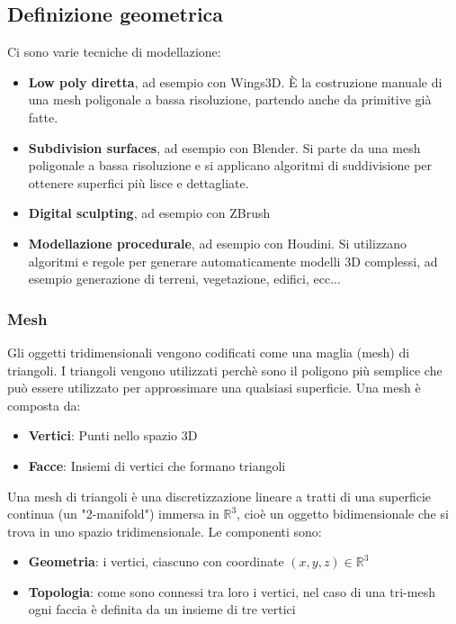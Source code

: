 \documentclass[a4paper]{article}
\begin{document}
\subsection{Definizione geometrica}
Ci sono varie tecniche di modellazione:
\begin{itemize}
  \item \textbf{Low poly diretta}, ad esempio con Wings3D. È la costruzione manuale di una mesh
    poligonale a bassa risoluzione, partendo anche da primitive già fatte.
  \item \textbf{Subdivision surfaces}, ad esempio con Blender. Si parte da una mesh
    poligonale a bassa risoluzione e si applicano algoritmi di suddivisione per
    ottenere superfici più lisce e dettagliate.
  \item \textbf{Digital sculpting}, ad esempio con ZBrush
  \item \textbf{Modellazione procedurale}, ad esempio con Houdini. Si utilizzano algoritmi
    e regole per generare automaticamente modelli 3D complessi, ad esempio generazione di
    terreni, vegetazione, edifici, ecc...
\end{itemize}

\subsubsection{Mesh}
Gli oggetti tridimensionali vengono codificati come una maglia (mesh) di triangoli.
I triangoli vengono utilizzati perchè sono il poligono più semplice che può essere utilizzato
per approssimare una qualsiasi superficie. Una mesh è composta da:
\begin{itemize}
  \item \textbf{Vertici}: Punti nello spazio 3D
  \item \textbf{Facce}: Insiemi di vertici che formano triangoli
\end{itemize}

\begin{definition}
  Una mesh di triangoli è una discretizzazione lineare a tratti di una superficie
  continua (un "2-manifold") immersa in \( \mathbb{R}^3 \), cioè un oggetto bidimensionale
  che si trova in uno spazio tridimensionale. Le componenti sono:
  \begin{itemize}
    \item \textbf{Geometria}: i vertici, ciascuno con coordinate \( (x, y, z) \in \mathbb{R}^3 \)
    \item \textbf{Topologia}: come sono connessi tra loro i vertici, nel caso di una tri-mesh
      ogni faccia è definita da un insieme di tre vertici
  \end{itemize}
\end{definition}
\end{document}
